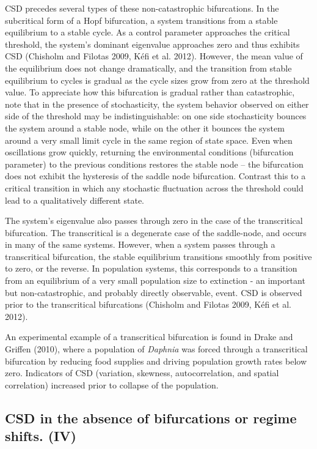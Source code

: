 \documentclass{article}
\begin{document}
CSD precedes several types of these non-catastrophic bifurcations. In
the subcritical form of a Hopf bifurcation, a system transitions from a
stable equilibrium to a stable cycle. As a control parameter approaches
the critical threshold, the system's dominant eigenvalue approaches zero
and thus exhibits CSD (Chisholm and Filotas 2009, Kéfi et al. 2012).
However, the mean value of the equilibrium does not change dramatically,
and the transition from stable equilibrium to cycles is gradual as the
cycle sizes grow from zero at the threshold value. To appreciate how
this bifurcation is gradual rather than catastrophic, note that in the
presence of stochasticity, the system behavior observed on either side
of the threshold may be indistinguishable: on one side stochasticity
bounces the system around a stable node, while on the other it bounces
the system around a very small limit cycle in the same region of state
space. Even when oscillations grow quickly, returning the environmental
conditions (bifurcation parameter) to the previous conditions restores
the stable node -- the bifurcation does not exhibit the hysteresis of
the saddle node bifurcation. Contrast this to a critical transition in
which any stochastic fluctuation across the threshold could lead to a
qualitatively different state.

The system's eigenvalue also passes through zero in the case of the
transcritical bifurcation. The transcritical is a degenerate case of the
saddle-node, and occurs in many of the same systems. However, when a
system passes through a transcritical bifurcation, the stable
equilibrium transitions smoothly from positive to zero, or the reverse.
In population systems, this corresponds to a transition from an
equilibrium of a very small population size to extinction - an important
but non-catastrophic, and probably directly observable, event. CSD is
observed prior to the transcritical bifurcations (Chisholm and Filotas
2009, Kéfi et al. 2012).

An experimental example of a transcritical bifurcation is found in Drake
and Griffen (2010), where a population of \emph{Daphnia} was forced
through a transcritical bifurcation by reducing food supplies and
driving population growth rates below zero. Indicators of CSD
(variation, skewness, autocorrelation, and spatial correlation)
increased prior to collapse of the population.

\subsection{CSD in the absence of bifurcations or regime shifts. (IV)}
\end{document}
